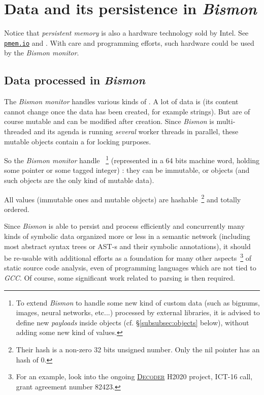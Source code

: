 \section{Data and its persistence in \emph{Bismon}}
\label{sec:datapersist}

Notice that \emph{persistent memory} is also a hardware technology
sold by Intel. See \href{https://pmem.io/}{\texttt{pmem.io}} and
\cite{Scargall:2020:programming}. With care and programming efforts,
such hardware could be used by the \emph{Bismon monitor}.

\subsection{Data processed in \emph{Bismon}}

\label{subsec:dataproc}

The \emph{Bismon monitor} handles various kinds of
. A lot of data is  (its
content cannot change once the data has been created, for example
strings). But  are of course mutable
and can be modified after creation. Since \emph{Bismon} is
multi-threaded and its agenda is running \emph{several} worker threads
in parallel, these mutable objects contain a  for
locking purposes.

So the \emph{Bismon monitor} handle
~\footnote{To extend \emph{Bismon} to
  handle some new kind of custom data (such as bignums, images, neural
  networks, etc...) processed by external libraries, it is advised to
  define new \emph{payloads} inside objects
  (cf. \S\ref{subsubsec:objects} below), without adding some new kind
  of values.} (represented in a 64 bits machine word, holding some
pointer or some tagged integer) : they can be immutable, or objects
(and such objects are the only kind of mutable data).

All values (immutable ones and mutable objects) are
hashable~\footnote{Their hash is a non-zero 32 bits unsigned
  number. Only the nil pointer has an hash of 0.}  and totally
ordered.

\medskip

Since \emph{Bismon} is able to persist and process efficiently and
concurrently many kinds of symbolic data organized more or less in a
semantic network (including most abstract syntax trees or AST-s
 and their symbolic annotations), it should be re-usable
with additional efforts as a foundation for many other
aspects~\footnote{For an example, look into the ongoing 
  \href{https://www.decoder-project.eu/}{\textsc{Decoder}}
   H2020
  project, ICT-16 call, grant agreement number 82423.} of static
source code analysis, even of programming languages which are not tied
to \emph{GCC}. Of course, some significant work related to parsing is
then required.

